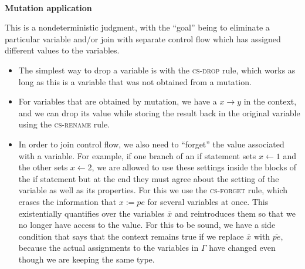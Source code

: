 \documentclass[acmsmall,nonacm]{acmart}
\newcommand{\proves}{\vdash}
\newcommand{\constep}{\Rightarrow}
\newcommand{\judgment}[2][]{\noindent\\\textbf{#1}\hspace{\stretch{1}}\fbox{$#2$}\nopagebreak}
\newcommand*{\axiom}[2][]{\infer[#1]{}{#2}}
\begin{document}
\judgment[Mutation application]{\Gamma\proves\delta \constep\delta'}

This is a nondeterministic judgment, with the ``goal'' being to eliminate a particular variable and/or join with separate control flow which has assigned different values to the variables.
\begin{itemize}
\item The simplest way to drop a variable is with the \textsc{cs-drop} rule, which works as long as this is a variable that was not obtained from a mutation.
\item For variables that are obtained by mutation, we have a $x\to y$ in the context, and we can drop its value while storing the result back in the original variable using the \textsc{cs-rename} rule.
\item In order to join control flow, we also need to ``forget'' the value associated with a variable. For example, if one branch of an if statement sets $x\gets 1$ and the other sets $x\gets 2$, we are allowed to use these settings inside the blocks of the if statement but at the end they must agree about the setting of the variable as well as its properties. For this we use the \textsc{cs-forget} rule, which erases the information that $x:=pe$ for several variables at once. This existentially quantifies over the variables $\overline{x}$ and reintroduces them so that we no longer have access to the value. For this to be sound, we have a side condition that says that the context remains true if we replace $\overline{x}$ with $\overline{pe}$, because the actual assignments to the variables in $\Gamma$ have changed even though we are keeping the same type.
\end{itemize}
\end{document}
